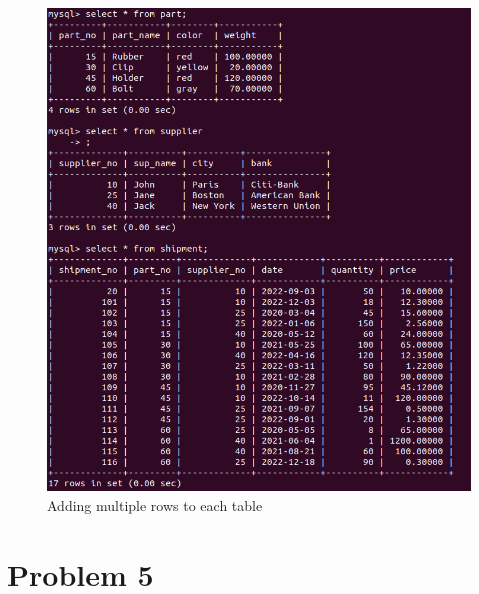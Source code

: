 \documentclass{article}
\begin{document}
\begin{figure}[!ht]
  \begin{center}
  \includegraphics[scale=1]{added_multiple_data_4.png}
  \caption{Adding multiple rows to each table}
  \end{center}
\end{figure}
\newpage

\section{Problem 5}
\end{document}
